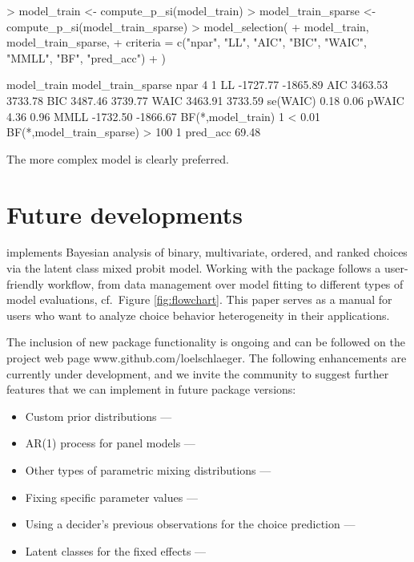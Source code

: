 \documentclass[article,shortnames]{jss}
\begin{document}
\begin{Schunk}
\begin{Sinput}
> model_train <- compute_p_si(model_train)
> model_train_sparse <- compute_p_si(model_train_sparse)
> model_selection(
+    model_train, model_train_sparse,
+    criteria = c("npar", "LL", "AIC", "BIC", "WAIC", "MMLL", "BF", "pred_acc")
+  )
\end{Sinput}
\begin{Soutput}
                         model_train model_train_sparse
npar                               4                  1
LL                          -1727.77           -1865.89
AIC                          3463.53            3733.78
BIC                          3487.46            3739.77
WAIC                         3463.91            3733.59
se(WAIC)                        0.18               0.06
pWAIC                           4.36               0.96
MMLL                        -1732.50           -1866.67
BF(*,model_train)                  1             < 0.01
BF(*,model_train_sparse)       > 100                  1
pred_acc                      69.48%
\end{Soutput}
\end{Schunk}

The more complex model is clearly preferred.

\section{Future developments} \label{sec:conclusion}

 implements Bayesian analysis of binary, multivariate, ordered, and ranked choices via the latent class mixed probit model. Working with the package follows a user-friendly workflow, from data management over model fitting to different types of model evaluations, cf.\ Figure \ref{fig:flowchart}. This paper serves as a manual for  users who want to analyze choice behavior heterogeneity in their applications.

The inclusion of new package functionality is ongoing and can be followed on the project web page www.github.com/loelschlaeger. The following enhancements are currently under development, and we invite the community to suggest further features that we can implement in future package versions:

\begin{itemize}
  \item Custom prior distributions ---
  \item AR(1) process for panel models ---
  \item Other types of parametric mixing distributions ---
  \item Fixing specific parameter values ---
  \item Using a decider's previous observations for the choice prediction ---
  \item Latent classes for the fixed effects ---
\end{itemize}
\end{document}
